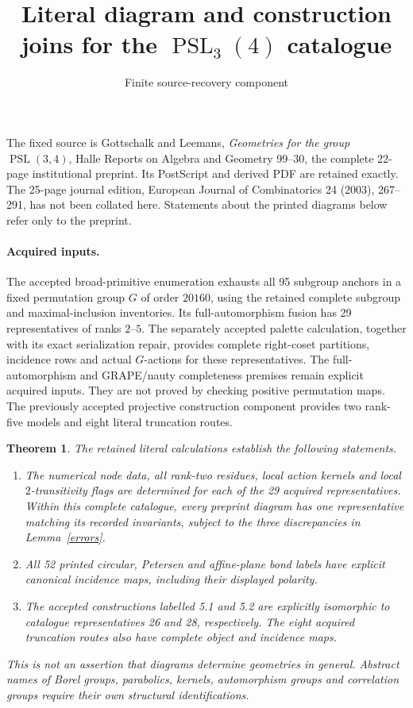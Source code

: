 \documentclass[10pt]{article}
\title{Literal diagram and construction joins for the $\operatorname{PSL}_3(4)$ catalogue}
\author{Finite source-recovery component}\date{}
\newtheorem{theorem}{Theorem}\newtheorem{lemma}{Lemma}
\begin{document}
\maketitle
\noindent
The fixed source is Gottschalk and Leemans, \emph{Geometries for the group
$\operatorname{PSL}(3,4)$}, Halle Reports on Algebra and Geometry 99--30,
the complete 22-page institutional preprint.  Its PostScript and derived PDF
are retained exactly.  The 25-page journal edition, European Journal of
Combinatorics 24 (2003), 267--291, has not been collated here.  Statements about
the printed diagrams below refer only to the preprint.

\paragraph{Acquired inputs.}
The accepted broad-primitive enumeration exhausts all 95 subgroup anchors in a
fixed permutation group $G$ of order $20160$, using the retained complete
subgroup and maximal-inclusion inventories.  Its full-automorphism fusion has
29 representatives of ranks $2$--$5$.  The separately accepted palette
calculation, together with its exact serialization repair, provides complete
right-coset partitions, incidence rows and actual $G$-actions for these
representatives.  The full-automorphism and GRAPE/nauty completeness premises
remain explicit acquired inputs.  They are not proved by checking positive
permutation maps.  The previously accepted projective construction component
provides two rank-five models and eight literal truncation routes.

\begin{theorem}
The retained literal calculations establish the following statements.
\begin{enumerate}
\item The numerical node data, all rank-two residues, local action kernels
and local $2$-transitivity flags are determined for each of the 29 acquired
representatives.  Within this complete catalogue, every preprint diagram has
one representative matching its recorded invariants, subject to the three
discrepancies in Lemma~\ref{errors}.
\item All 52 printed circular, Petersen and affine-plane bond labels have
explicit canonical incidence maps, including their displayed polarity.
\item The accepted constructions labelled 5.1 and 5.2 are explicitly isomorphic
to catalogue representatives 26 and 28, respectively.  The eight acquired
truncation routes also have complete object and incidence maps.
\end{enumerate}
This is not an assertion that diagrams determine geometries in general.
Abstract names of Borel groups, parabolics, kernels, automorphism groups and
correlation groups require their own structural identifications.
\end{theorem}
\end{document}
